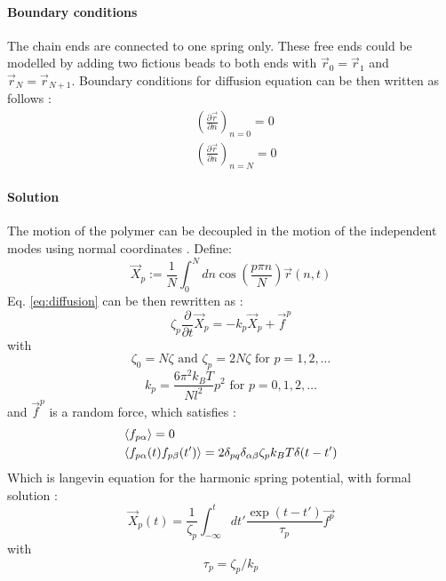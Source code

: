 \documentclass[
    paper=A4,pagesize=automedia,fontsize=12pt,
    BCOR=15mm,DIV=22,
    twoside,headinclude,footinclude=false,
    fleqn,             %
    bibliography=totocnumbered,          %
    listof=totoc,                %
    listof=flat,                 %
    cleardoublepage=empty      %
    numbers=endperiod
]{scrartcl}
\begin{document}
\paragraph{Boundary conditions}
The chain ends are connected to one spring only. These free ends could be modelled by adding two 
fictious beads to both ends with $\vec{r}_0=\vec{r}_1$ and $\vec{r}_N=\vec{r}_{N+1}$. Boundary 
conditions for diffusion equation can be then written as follows \cite{Rub_Colby_PolyPhy:2005}:
\begin{equation}
    \label{eq:rouse_boundary}
    \begin{aligned}
        & \left(\frac{\partial \vec{r}}{\partial n}\right)_{n=0} = 0\\
        & \left(\frac{\partial \vec{r}}{\partial n}\right)_{n=N} = 0
    \end{aligned}
\end{equation}

\paragraph{Solution}
The motion of the polymer can be decoupled in the motion of the independent modes using normal
coordinates \cite{Doi_Edwards_PD:1994}. Define:
\begin{equation}
    \label{eq:rouse_mode}
    \vec{X}_p := \frac{1}{N} \int_0^N dn \cos(\frac{p \pi n}{N})\vec{r}(n, t)
\end{equation}
Eq. \ref{eq:diffusion} can be then rewritten as \cite{Doi_Edwards_PD:1994}:
\begin{equation}
    \zeta_p \frac{\partial}{\partial t} \vec{X}_p = -k_p \vec{X}_p + \vec{f}^p
\end{equation}
with 
\begin{equation}
    \zeta_0 = N \zeta
    \text{ and }
    \zeta_p = 2 N \zeta
    \text{ for } p = 1,2,\ldots
\end{equation}
\begin{equation}
    k_p = \frac{6 \pi^2 k_B T}{Nl^2} p^2
    \text{ for } p = 0,1,2,\ldots
\end{equation}
and $\vec{f}^p$ is a random force, which satisfies \cite{Doi_Edwards_PD:1994}:
\begin{equation}
    \begin{aligned}
        & \langle f_{p\alpha}\rangle = 0\\
        & \langle f_{p\alpha}(t) f_{p\beta}(t')\rangle = 2 \delta_{pq} \delta_{\alpha\beta} \zeta_p k_B T \delta(t-t')
    \end{aligned}
\end{equation}
Which is langevin equation for the harmonic spring potential, with formal solution \cite{Doi_Edwards_PD:1994}:
\begin{equation}
    \vec{X}_p(t) = \frac{1}{\zeta_p} \int_{-\infty}^{t} dt' \frac{\exp(t-t')}{\tau_p} \vec{f^p}
\end{equation}
with
\begin{equation}
    \tau_p = \zeta_p / k_p
\end{equation}
\end{document}
